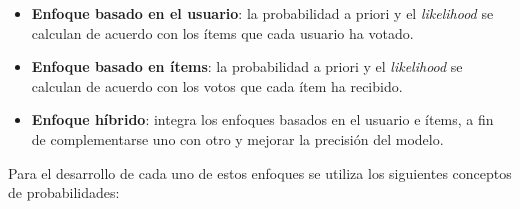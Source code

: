 \documentclass[runningheads,a4paper]{llncs}
\begin{document}
\begin{itemize}
    \item \textbf{Enfoque basado en el usuario}:
    la probabilidad a priori y el \textit{likelihood} se
    calculan de acuerdo con los ítems que cada usuario ha votado. \cite{tesis_sistema_recomendador_hibrido}
    \item \textbf{Enfoque basado en ítems}:
    la probabilidad a priori y el \textit{likelihood} se calculan
    de acuerdo con los votos que cada ítem ha recibido. \cite{tesis_sistema_recomendador_hibrido}
    \item \textbf{Enfoque híbrido}:
    integra los enfoques basados en el usuario e ítems, a fin
    de complementarse uno con otro y mejorar la precisión del modelo. \cite{tesis_sistema_recomendador_hibrido}

\end{itemize}

Para el desarrollo de cada uno de estos enfoques se 
utiliza los siguientes conceptos de probabilidades:
\end{document}
